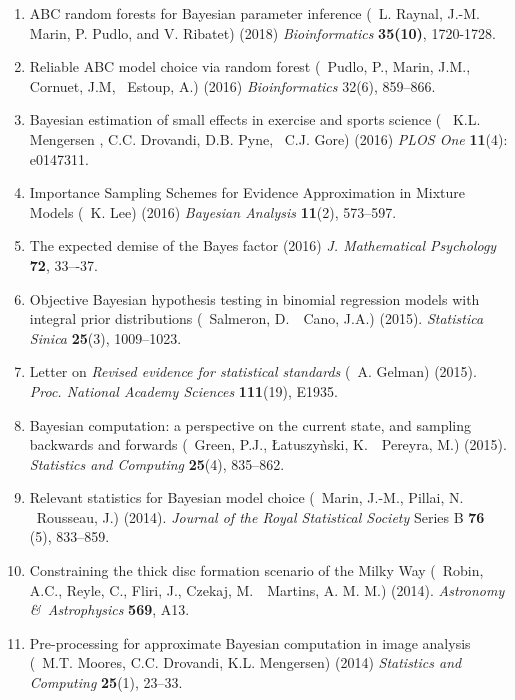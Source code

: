 \begin{enumerate}
\item ABC random forests for Bayesian parameter inference (\avec~L. Raynal, J.-M. Marin, P. Pudlo, and V. Ribatet) (2018) {\em Bioinformatics} {\bf 35(10)}, 1720-1728.

\item Reliable ABC model choice via random forest (\avec~Pudlo, P., Marin, J.M., Cornuet, J.M, \et~Estoup, A.) (2016)
{\em Bioinformatics} 32(6), 859--866.

\item Bayesian estimation of small effects in exercise and sports science (\avec~
K.L. Mengersen , C.C. Drovandi, D.B. Pyne, \et~C.J. Gore) (2016)
{\em PLOS One} {\bf 11}(4): e0147311.

\item Importance Sampling Schemes for Evidence Approximation in Mixture Models (\avec~K. Lee) (2016)
{\em Bayesian Analysis} {\bf 11}(2), 573--597.

\item The expected demise of the Bayes factor (2016) {\em J. Mathematical Psychology}
{\bf 72}, 33–-37.

\item Objective Bayesian hypothesis testing in binomial regression models with integral prior distributions
(\avec~Salmeron, D.~\et~Cano, J.A.) (2015). {\em Statistica Sinica} {\bf 25}(3), 1009--1023. 

\item Letter on {\em Revised evidence for statistical standards} (\avec~A. Gelman) (2015).
{\em Proc. National Academy Sciences} {\bf 111}(19), E1935.

\item Bayesian computation: a perspective on the current
state, and sampling backwards and forwards (\avec~Green, P.J., Łatuszy{\`n}ski, K.~\et~Pereyra, M.) (2015).
{\em Statistics and Computing} {\bf 25}(4), 835--862.

\item Relevant statistics for Bayesian model choice (\avec~Marin, J.-M., Pillai, N. \et~Rousseau, J.) (2014). 
{\em Journal of the Royal Statistical Society} Series B {\bf 76} (5), 833--859.

\item Constraining the thick disc formation scenario of the Milky Way (\avec~Robin, A.C., Reyle, C., 
Fliri, J., Czekaj, M.~\et~Martins, A. M. M.) (2014). {\em Astronomy \&~Astrophysics} {\bf 569}, A13.

\item Pre-processing for approximate Bayesian computation in image analysis (\avec~M.T. Moores, C.C. Drovandi, K.L.
Mengersen) (2014) {\em Statistics and Computing} {\bf 25}(1), 23--33.


\end{enumerate}
